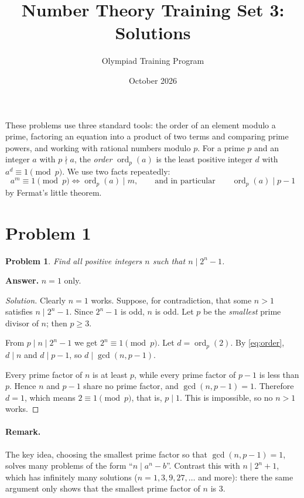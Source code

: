 \documentclass[11pt]{article}
\title{Number Theory Training Set 3: Solutions}
\author{Olympiad Training Program}
\date{October 2026}
\theoremstyle{problemstyle}
\newtheorem{problem}{Problem}
\theoremstyle{plain}
\newenvironment{solution}{\begin{proof}[Solution]}{\end{proof}}
\DeclareMathOperator{\ord}{ord}
\begin{document}
\maketitle

These problems use three standard tools: the order of an element modulo a prime, factoring an equation into a product of two terms and comparing prime powers, and working with rational numbers modulo $p$. For a prime $p$ and an integer $a$ with $p \nmid a$, the \emph{order} $\ord_p(a)$ is the least positive integer $d$ with $a^d \equiv 1 \pmod p$. We use two facts repeatedly:
\begin{equation}\label{eq:order}
  a^m \equiv 1 \pmod p \iff \ord_p(a) \mid m,
  \qquad\text{and in particular}\qquad
  \ord_p(a) \mid p - 1
\end{equation}
by Fermat's little theorem.

\section*{Problem 1}

\begin{problem}
Find all positive integers $n$ such that $n \mid 2^n - 1$.
\end{problem}

\noindent\textbf{Answer.} $n = 1$ only.

\begin{solution}
Clearly $n = 1$ works. Suppose, for contradiction, that some $n > 1$ satisfies $n \mid 2^n - 1$. Since $2^n - 1$ is odd, $n$ is odd. Let $p$ be the \emph{smallest} prime divisor of $n$; then $p \ge 3$.

From $p \mid n \mid 2^n - 1$ we get $2^n \equiv 1 \pmod p$. Let $d = \ord_p(2)$. By \eqref{eq:order}, $d \mid n$ and $d \mid p - 1$, so $d \mid \gcd(n, p - 1)$.

Every prime factor of $n$ is at least $p$, while every prime factor of $p - 1$ is less than $p$. Hence $n$ and $p - 1$ share no prime factor, and $\gcd(n, p - 1) = 1$. Therefore $d = 1$, which means $2 \equiv 1 \pmod p$, that is, $p \mid 1$. This is impossible, so no $n > 1$ works.
\end{solution}

\paragraph{Remark.} The key idea, choosing the smallest prime factor so that $\gcd(n, p - 1) = 1$, solves many problems of the form ``$n \mid a^n - b$''. Contrast this with $n \mid 2^n + 1$, which has infinitely many solutions ($n = 1, 3, 9, 27, \dots$ and more): there the same argument only shows that the smallest prime factor of $n$ is $3$.
\end{document}
